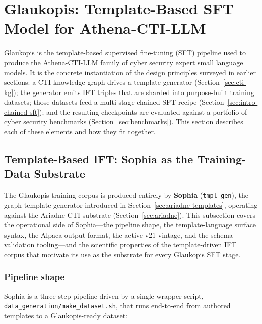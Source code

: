 \documentclass[unnumsec,webpdf,contemporary,large]{oup-authoring-template}
\theoremstyle{thmstyleone}
\theoremstyle{thmstyletwo}
\theoremstyle{thmstylethree}
\begin{document}
\section{Glaukopis: Template-Based SFT Model for Athena-CTI-LLM}
\label{sec:glaukopis}

Glaukopis is the template-based supervised fine-tuning (SFT) pipeline used to produce the Athena-CTI-LLM family of cyber security expert small language models. It is the concrete instantiation of the design principles surveyed in earlier sections: a CTI knowledge graph drives a template generator (Section~\ref{sec:cti-kg}); the generator emits IFT triples that are sharded into purpose-built training datasets; those datasets feed a multi-stage chained SFT recipe (Section~\ref{sec:intro-chained-sft}); and the resulting checkpoints are evaluated against a portfolio of cyber security benchmarks (Section~\ref{sec:benchmarks}). This section describes each of these elements and how they fit together.

\subsection{Template-Based IFT: Sophia as the Training-Data Substrate}
\label{sec:glaukopis-template}

The Glaukopis training corpus is produced entirely by \textbf{Sophia} (\texttt{tmpl\_gen}), the graph-template generator introduced in Section~\ref{sec:ariadne-templates}, operating against the Ariadne CTI substrate (Section~\ref{sec:ariadne}). This subsection covers the operational side of Sophia---the pipeline shape, the template-language surface syntax, the Alpaca output format, the active v21 vintage, and the schema-validation tooling---and the scientific properties of the template-driven IFT corpus that motivate its use as the substrate for every Glaukopis SFT stage.

\subsubsection*{Pipeline shape}
Sophia is a three-step pipeline driven by a single wrapper script, \texttt{data\_generation/make\_dataset.sh}, that runs end-to-end from authored templates to a Glaukopis-ready dataset:
\end{document}
